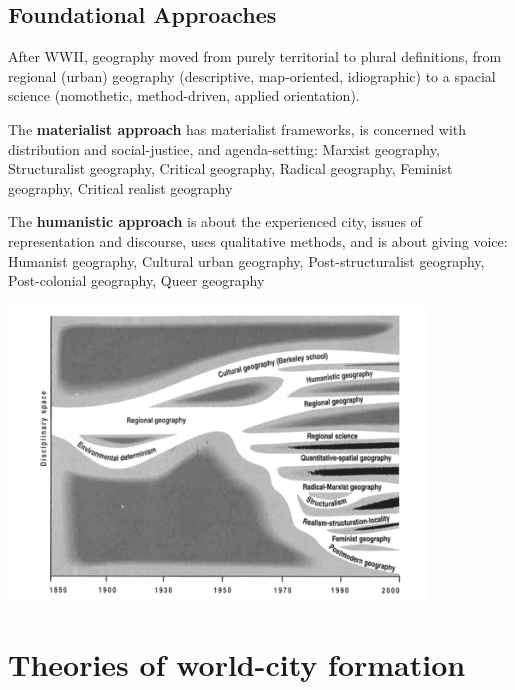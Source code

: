 \documentclass{article}
\begin{document}
\subsection{Foundational Approaches}

After WWII, geography moved from purely territorial to plural definitions, from regional (urban) geography (descriptive, map-oriented, idiographic) to a spacial science (nomothetic, method-driven, applied orientation).

The \textbf{materialist approach} has materialist frameworks, is concerned with distribution and social-justice, and agenda-setting: Marxist geography, Structuralist geography, Critical geography, Radical geography, Feminist geography, Critical realist geography

The \textbf{humanistic approach} is about the experienced city, issues of representation and discourse, uses qualitative methods, and is about giving voice: Humanist geography, Cultural urban geography, Post-structuralist geography, Post-colonial geography, Queer geography

\begin{center}
	\includegraphics[width=30em]{geography_approaches.png}
\end{center}


\pagebreak\section{Theories of world-city formation}
\date{Octobre 4th, 2021}
\end{document}

